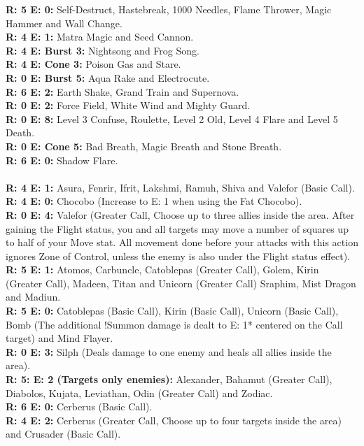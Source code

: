 \textbf{R: 5 E: 0:} Self-Destruct, Hastebreak, 1000 Needles, Flame Thrower, Magic Hammer and Wall Change.\\
\textbf{R: 4 E: 1:} Matra Magic and Seed Cannon.\\
\textbf{R: 4 E: Burst 3:} Nightsong and Frog Song.\\
\textbf{R: 4 E: Cone 3:} Poison Gas and Stare.\\
\textbf{R: 0 E: Burst 5:} Aqua Rake and Electrocute.\\
\textbf{R: 6 E: 2:} Earth Shake, Grand Train and Supernova.\\
\textbf{R: 0 E: 2:} Force Field, White Wind and Mighty Guard.\\
\textbf{R: 0 E: 8:} Level 3 Confuse, Roulette, Level 2 Old, Level 4 Flare and Level 5 Death.\\
\textbf{R: 0 E: Cone 5:} Bad Breath, Magic Breath and Stone Breath.\\
\textbf{R: 6 E: 0:} Shadow Flare.
%
\\\\
%
 \ofrow
\textbf{R: 4 E: 1:} Asura, Fenrir, Ifrit, Lakshmi, Ramuh, Shiva and Valefor (Basic Call).\\
\textbf{R: 4 E: 0:} Chocobo (Increase to E: 1 when using the Fat Chocobo).\\
\textbf{R: 0 E: 4:} Valefor (Greater Call, Choose up to three allies inside the area. After gaining the Flight status, you and all targets may move a number of squares up to half of your Move stat. All movement done before your attacks with this action ignores Zone of Control, unless the enemy is also under the Flight status effect).\\
\textbf{R: 5 E: 1:} Atomos, Carbuncle, Catoblepas (Greater Call), Golem, Kirin (Greater Call), Madeen, Titan and Unicorn (Greater Call) Sraphim, Mist Dragon and Madiun.\\
\textbf{R: 5 E: 0:} Catoblepas (Basic Call), Kirin (Basic Call), Unicorn (Basic Call), Bomb (The additional !Summon damage is dealt to E: 1* centered on the Call target) and Mind Flayer.\\
\textbf{R: 0 E: 3:} Silph (Deals damage to one enemy and heals all allies inside the area).\\
\textbf{R: 5: E: 2 (Targets only enemies):} Alexander, Bahamut (Greater Call), Diabolos, Kujata, Leviathan, Odin (Greater Call) and Zodiac.\\
\textbf{R: 6 E: 0:} Cerberus (Basic Call).\\
\textbf{R: 4 E: 2:} Cerberus (Greater Call, Choose up to four targets inside the area) and Crusader (Basic Call).\\
